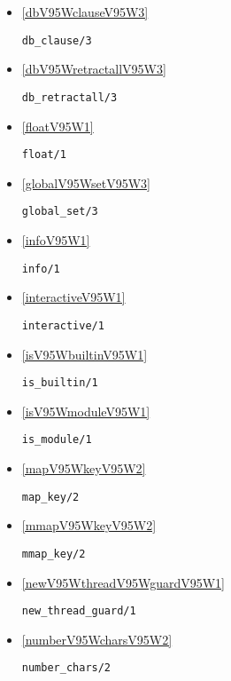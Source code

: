 \begin{itemize}
\item \ref{dbV95WclauseV95W3} 
\begin{verbatim}
db_clause/3
\end{verbatim}

\item \ref{dbV95WretractallV95W3} 
\begin{verbatim}
db_retractall/3
\end{verbatim}

\item \ref{floatV95W1} 
\begin{verbatim}
float/1
\end{verbatim}

\item \ref{globalV95WsetV95W3} 
\begin{verbatim}
global_set/3
\end{verbatim}

\item \ref{infoV95W1} 
\begin{verbatim}
info/1
\end{verbatim}

\item \ref{interactiveV95W1} 
\begin{verbatim}
interactive/1
\end{verbatim}

\item \ref{isV95WbuiltinV95W1} 
\begin{verbatim}
is_builtin/1
\end{verbatim}

\item \ref{isV95WmoduleV95W1} 
\begin{verbatim}
is_module/1
\end{verbatim}

\item \ref{mapV95WkeyV95W2} 
\begin{verbatim}
map_key/2
\end{verbatim}

\item \ref{mmapV95WkeyV95W2} 
\begin{verbatim}
mmap_key/2
\end{verbatim}

\item \ref{newV95WthreadV95WguardV95W1} 
\begin{verbatim}
new_thread_guard/1
\end{verbatim}

\item \ref{numberV95WcharsV95W2} 
\begin{verbatim}
number_chars/2
\end{verbatim}


\end{itemize}

